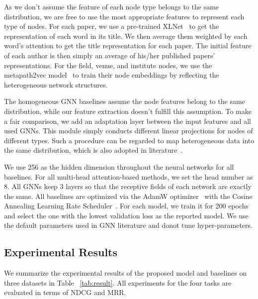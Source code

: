 \documentclass[sigconf]{acmart}
\theoremstyle{definition}
\begin{document}
As we don't assume the feature of each node type belongs to the same distribution, we are free to use the most appropriate features to represent each type of nodes. 
For each paper, we use a pre-trained XLNet~\cite{xlnet, wolf2019transformers} to get the representation of each word in its title. 
We then average them weighted by each word's attention to get the title representation for each paper. 
The initial feature of each author is then simply an average of his/her published papers' representations. 
For the field, venue, and institute nodes, we use the metapath2vec model~\cite{dong2017metapath2vec} to train their node embeddings by reflecting the heterogeneous network structures. 



The homogeneous GNN baselines assume the node features belong to the same distribution, while our feature extraction doesn't fulfill this assumption. 
To make a fair comparison, we add an adaptation layer between the input features and all used GNNs. 
This module simply conducts different linear projections for nodes of different  types. 
Such a procedure can be regarded to map heterogeneous data into the same distribution, which is also adopted in literature~\cite{DBLP:conf/kdd/ZhangSHSC19, DBLP:conf/www/WangJSWYCY19}. 

We use 256 as the hidden dimension throughout the neural networks for all baselines. For all multi-head attention-based methods, we set the head number as 8. 
All GNNs keep 3 layers so that the receptive fields of each network are exactly the same. 
All baselines are optimized via the AdamW optimizer~\cite{DBLP:conf/iclr/LoshchilovH19} with the Cosine Annealing Learning Rate Scheduler~\cite{DBLP:conf/iclr/LoshchilovH17}. For each model, we train it for 200 epochs and select the one with the lowest validation loss as the reported model. We use the default parameters used in GNN literature and donot tune hyper-parameters. 





\subsection{Experimental Results}
We summarize the experimental results of the proposed model and baselines on three datasets in  Table ~\ref{tab:result}. 
All experiments for the four tasks are evaluated in terms of NDCG and MRR. 
\end{document}
